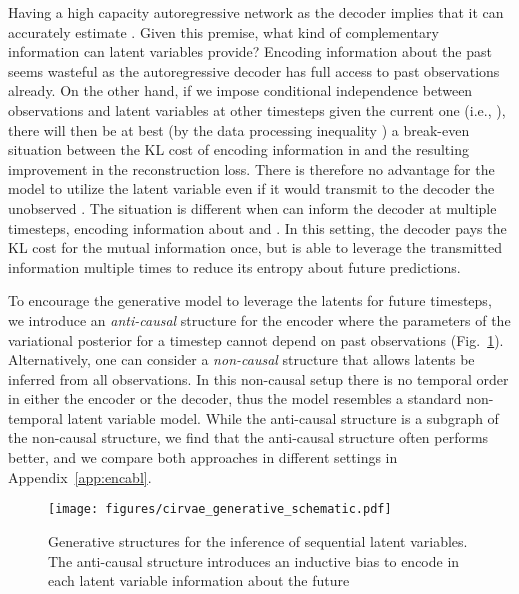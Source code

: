 \documentclass{article} \usepackage{iclr2019_conference,times}
\def\figref#1{figure~\ref{#1}}
\renewcommand{\figref}[1]{Fig.~\ref{#1}}
\newcommand{\aref}[1]{Appendix~\ref{#1}}
\begin{document}
 Having a high capacity autoregressive network as the decoder implies that it can accurately estimate .
Given this premise, what kind of complementary information can latent variables provide? Encoding information about the past seems wasteful as the autoregressive decoder has full access to past observations already. On the other hand, if we impose conditional independence between observations and latent variables at other timesteps given the current one (i.e., ), there will then be at best (by the data processing inequality \citep{ThomasCover}) a break-even situation between the KL cost of encoding information in  and the resulting improvement in the reconstruction loss. There is therefore no advantage for the model to utilize the latent variable even if it would transmit to the decoder the unobserved . The situation is different when  can inform the decoder at multiple timesteps, encoding information about  and . In this setting, the decoder pays the KL cost for the mutual information once, but is able to leverage the transmitted information multiple times to reduce its entropy about future predictions. 


\par
To encourage the generative model to leverage the latents for future timesteps, we introduce an \emph{anti-causal} structure for the encoder where the parameters of the variational posterior for a timestep cannot depend on past observations (\figref{fig:gengraph}).
Alternatively, one can consider a \emph{non-causal} structure that allows latents be inferred from all observations. 
In this non-causal setup there is no temporal order in either the encoder or the decoder, thus the model resembles a standard non-temporal latent variable model. While the anti-causal structure is
a subgraph of the non-causal structure, we find that the anti-causal structure often performs better, and we compare both approaches in different settings in \aref{app:encabl}. 

\par

\begin{figure}[th!]
    \centering

    \texttt{[image: figures/cirvae\_generative\_schematic.pdf]}
   
    \caption{Generative structures for the inference of sequential latent variables. The anti-causal structure introduces an inductive bias to encode
    in each latent variable information about the future}
    \label{fig:gengraph}
\end{figure}
\end{document}
